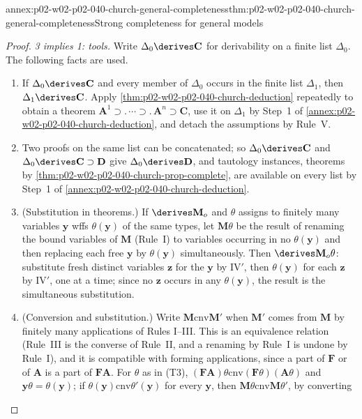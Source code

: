 \begin{annexitem}{annex:p02-w02-p02-040-church-general-completeness}{thm:p02-w02-p02-040-church-general-completeness}{Strong completeness for general models}
\begin{proof}
\emph{3 implies 1: tools.}  Write \(\Delta_0\derives\mathbf C\) for derivability
on a finite list \(\Delta_0\).  The following facts are used.
\begin{enumerate}
 \item[(T1)] If \(\Delta_0\derives\mathbf C\) and every member of \(\Delta_0\)
   occurs in the finite list \(\Delta_1\), then \(\Delta_1\derives\mathbf C\).
   Apply \cref{thm:p02-w02-p02-040-church-deduction} repeatedly to obtain a
   theorem \(\mathbf A^1\supset.\,\cdots\supset.\,\mathbf A^n\supset\mathbf C\),
   use it on \(\Delta_1\) by Step~1 of
   \cref{annex:p02-w02-p02-040-church-deduction}, and detach the
   assumptions by Rule~V.
 \item[(T2)] Two proofs on the same list can be concatenated; so
   \(\Delta_0\derives\mathbf C\) and \(\Delta_0\derives\mathbf C\supset\mathbf D\)
   give \(\Delta_0\derives\mathbf D\), and tautology instances, theorems by
   \cref{thm:p02-w02-p02-040-church-prop-complete}, are available on every
   list by Step~1 of \cref{annex:p02-w02-p02-040-church-deduction}.
 \item[(T3)] (Substitution in theorems.)  If \(\derives\mathbf M_o\) and
   \(\theta\) assigns to finitely many variables \(\mathbf y\) wffs
   \(\theta(\mathbf y)\) of the same types, let \(\mathbf M\theta\) be the result of
   renaming the bound variables of \(\mathbf M\) (Rule~I) to variables occurring
   in no \(\theta(\mathbf y)\) and then replacing each free \(\mathbf y\) by
   \(\theta(\mathbf y)\) simultaneously.  Then \(\derives\mathbf M_o\theta\):
   substitute fresh distinct variables \(\mathbf z\) for the \(\mathbf y\) by
   IV\('\), then \(\theta(\mathbf y)\) for each \(\mathbf z\) by IV\('\), one at a
   time; since no \(\mathbf z\) occurs in any \(\theta(\mathbf y)\), the result is
   the simultaneous substitution.
 \item[(T4)] (Conversion and substitution.)  Write
   \(\mathbf M\mathrel{\mathrm{cnv}}\mathbf M'\) when \(\mathbf M'\) comes from \(\mathbf M\) by finitely
   many applications of Rules I--III.  This is an equivalence relation
   (Rule~III is the converse of Rule~II, and a renaming by Rule~I is undone by
   Rule~I), and it is compatible with forming applications, since a part of
   \(\mathbf F\) or of \(\mathbf A\) is a part of \(\mathbf F\mathbf A\).  For
   \(\theta\) as in (T3), \((\mathbf F\mathbf A)\theta\mathrel{\mathrm{cnv}}(\mathbf F\theta)(\mathbf A\theta)\)
   and \(\mathbf y\theta=\theta(\mathbf y)\); if \(\theta(\mathbf y)\mathrel{\mathrm{cnv}}\theta'(\mathbf y)\)
   for every \(\mathbf y\), then \(\mathbf M\theta\mathrel{\mathrm{cnv}}\mathbf M\theta'\), by converting

\end{enumerate}
\end{proof}
\end{annexitem}
